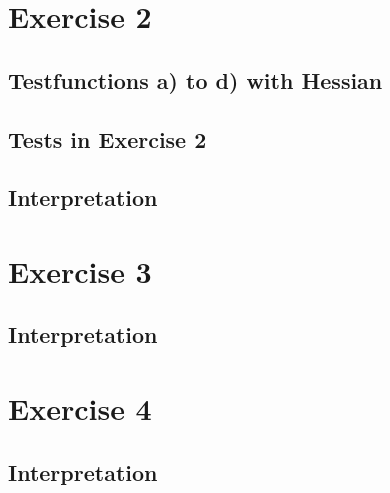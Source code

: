 \documentclass{article}
\begin{document}
\section{Exercise 2}
\subsection{Testfunctions a) to d) with Hessian}





\subsection{Tests in Exercise 2}


\subsection{Interpretation}

\section{Exercise 3}
\subsection{Interpretation}


\section{Exercise 4}
\subsection{Interpretation}
\end{document}
